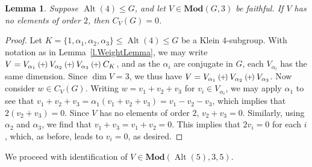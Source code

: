 \documentclass[a4paper, 11pt]{amsart}
\theoremstyle{plain}
\newtheorem{lemma}[theorem]{Lemma}
\theoremstyle{definition}
\theoremstyle{remark}
\newcommand{\qoplus}{\mathbin{\scalerel*{\left(\mkern-2mu+\mkern-2mu\right)}{\bigcirc}}}
\DeclareMathOperator{\Alt}{Alt}
\newcommand{\Mod}{\mathbf{Mod}}
\begin{document}
\begin{lemma}\label{l.C_V(G)Trivial}
Suppose $\Alt(4) \le G$, and let $V\in \Mod(G,3)$ be faithful.  If $V$ has no elements of order $2$, then $C_V(G) = 0$.
\end{lemma}
\begin{proof}
Let $K=\{1,\alpha_1, \alpha_2, \alpha_3\} \le \Alt(4) \le G$ be a Klein $4$-subgroup. With notation as in Lemma~\ref{l.WeightLemma}, we may write $V = V_{\alpha_1} \qoplus V_{\alpha_2} \qoplus V_{\alpha_3} \qoplus C_K$, and as the $\alpha_i$ are conjugate in $G$, each $V_{\alpha_i}$ has the same dimension. Since $\dim V = 3$, we thus have $V = V_{\alpha_1} \qoplus V_{\alpha_2} \qoplus V_{\alpha_3}$. Now consider $w \in C_V(G)$. Writing $w = v_1+v_2+v_3$ for $v_i\in V_{\alpha_i}$, we may apply  $\alpha_1$ to see that $v_1+v_2+v_3 = \alpha_1(v_1+v_2+v_3) = v_1 - v_2 - v_3$, which implies that $2(v_2+v_3) = 0$. Since $V$ has no elements of order $2$, $v_2+v_3 = 0$. Similarly, using $\alpha_2$ and $\alpha_3$, we find that $v_1+v_3 = v_1+v_2 = 0$. This implies that $2v_i=0$ for each $i$, which, as before, leads to  $v_i = 0$, as desired. 
\end{proof}

We proceed with identification of $V\in \Mod(\Alt(5),3,5)$.
\end{document}
